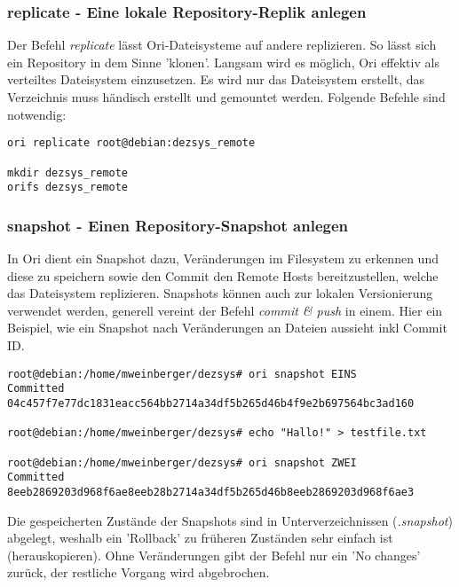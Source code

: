 \subsubsection{replicate - Eine lokale Repository-Replik anlegen}
\label{subsubsec:replicate - Eine lokale Repository-Replik anlegen}
Der Befehl \textit{replicate} lässt Ori-Dateisysteme auf andere replizieren. So lässt sich ein Repository in dem Sinne 'klonen'. Langsam wird es möglich, Ori effektiv als verteiltes Dateisystem einzusetzen. Es wird nur das Dateisystem erstellt, das Verzeichnis muss händisch erstellt und gemountet werden. Folgende Befehle sind notwendig:
\begin{lstlisting}[frame=single, caption=replicate]
ori replicate root@debian:dezsys_remote

mkdir dezsys_remote
orifs dezsys_remote
\end{lstlisting}

\clearpage

\subsubsection{snapshot - Einen Repository-Snapshot anlegen}
\label{subsubsec:snapshot - Einen Repository-Snapshot anlegen}
In Ori dient ein Snapshot dazu, Veränderungen im Filesystem zu erkennen und diese zu speichern sowie den Commit den Remote Hosts bereitzustellen, welche das Dateisystem replizieren. Snapshots können auch zur lokalen Versionierung verwendet werden, generell vereint der Befehl \textit{commit \& push} in einem. Hier ein Beispiel, wie ein Snapshot nach Veränderungen an Dateien aussieht inkl Commit ID.
\begin{lstlisting}[frame=single, caption=snapshot]
root@debian:/home/mweinberger/dezsys# ori snapshot EINS
Committed 04c457f7e77dc1831eacc564bb2714a34df5b265d46b4f9e2b697564bc3ad160

root@debian:/home/mweinberger/dezsys# echo "Hallo!" > testfile.txt

root@debian:/home/mweinberger/dezsys# ori snapshot ZWEI
Committed 8eeb2869203d968f6ae8eeb28b2714a34df5b265d46b8eeb2869203d968f6ae3
\end{lstlisting}
Die gespeicherten Zustände der Snapshots sind in Unterverzeichnissen (\textit{.snapshot}) abgelegt, weshalb ein 'Rollback' zu früheren Zuständen sehr einfach ist (herauskopieren). Ohne Veränderungen gibt der Befehl nur ein 'No changes' zurück, der restliche Vorgang wird abgebrochen.

